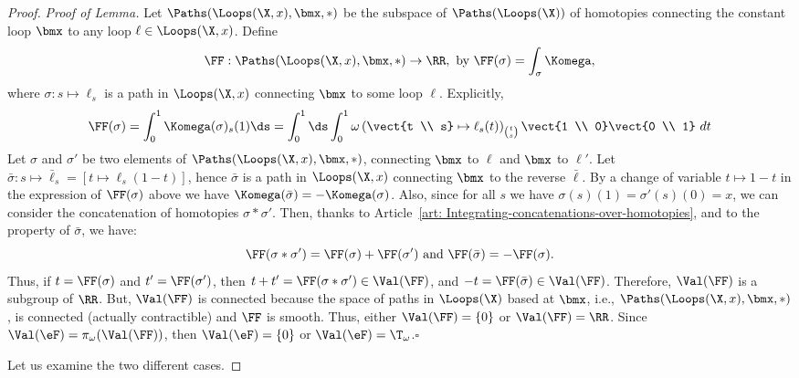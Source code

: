 \begin{proof}
    \textit{Proof of Lemma.}\hspace{1ex}
    Let $\Paths(\Loops(\X,x),\bmx,\ast)$ be the subspace of $\Paths(\Loops(\X))$ of homotopies connecting the constant loop $\bmx$ to any loop $\ell \in \Loops(\X,x)$.
    Define
    $$
      \FF : \Paths(\Loops(\X,x),\bmx,\ast) \to \RR, \text{ by } \FF(\sigma) = \int_\sigma \Komega,
      $$
    where $\sigma : s \mapsto \ell_s$ is a path in $\Loops(\X,x)$ connecting $\bmx$ to some loop $\ell$.
    Explicitly,
    $$
      \FF(\sigma) =  \int_0^1 \Komega(\sigma)_s(1) \ds = \int_0^1 \ds \int_0^1 \omega\left(\vect{t \\ s} \mapsto \ell_s(t)\right)_{t \choose s} \vect{1 \\ 0}\vect{0 \\ 1} \ dt
      $$
    Let $\sigma$ and $\sigma'$ be two elements of $\Paths(\Loops(\X,x),\bmx,\ast)$,
    connecting $\bmx$ to $\ell$ and $\bmx$ to $\ell'$.
    Let $\bar\sigma: s \mapsto \bar\ell_s = [t \mapsto \ell_s(1-t)]$,
    hence $\bar\sigma$ is a path in $\Loops(\X,x)$ connecting $\bmx$ to the reverse $\bar\ell$.
    By a change of variable $t \mapsto 1-t$ in the expression of $\FF(\sigma)$ above we have $\Komega(\bar\sigma) = - \Komega(\sigma)$.
    Also,
    since for all $s$ we have $\sigma(s)(1) = \sigma'(s)(0) = x$,
    we can consider the concatenation of homotopies $\sigma * \sigma'$.
    Then,
    thanks to Article~\ref{art: Integrating-concatenations-over-homotopies},
    and to the property of $\bar\sigma$,
    we have:
    \begin{equation}
      \renewcommand{\theequation}{$\ast$}
      \FF(\sigma*\sigma') = \FF(\sigma) + \FF(\sigma')
      \text{ and }
      \FF(\bar\sigma) = - \FF(\sigma).
    \end{equation}
    Thus,
    if $t = \FF(\sigma)$ and $t' = \FF(\sigma')$,
    then $t+t' = \FF(\sigma*\sigma') \in \Val(\FF)$,
    and $-t = \FF(\bar\sigma) \in \Val(\FF)$.
    Therefore,
    $\Val(\FF)$ is a subgroup of $\RR$.
    But,
    $\Val(\FF)$ is connected because the space of paths in $\Loops(\X)$ based at $\bmx$,
    i.e.,
    $\Paths(\Loops(\X,x),\bmx,\ast)$,
    is connected (actually contractible) and $\FF$ is smooth.
    Thus,
    either $\Val(\FF) = \{0\}$ or $\Val(\FF) = \RR$.
    Since $\Val(\eF) = \pi_\omega(\Val(\FF))$,
    then $\Val(\eF) = \{0\}$ or $\Val(\eF) = \T_\omega$.\hfill$\square$
    
    Let us examine the two different cases.
    

\end{proof}
